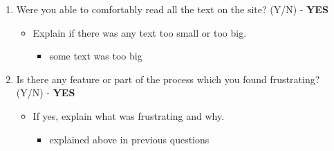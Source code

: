 \documentclass[12pt]{article}
\begin{document}
\begin{enumerate}
    \item Were you able to comfortably read all the text on the site? (Y/N) - \textbf{YES}
      \begin{itemize}
        \item Explain if there was any text too small or too big.
        \begin{itemize}
          \item some text was too big
        \end{itemize}
      \end{itemize}
    \item  Is there any feature or part of the process which you found frustrating? (Y/N) - \textbf{YES}
      \begin{itemize}
        \item If yes, explain what was frustrating and why.
        \begin{itemize}
          \item explained above in previous questions
        \end{itemize}
      \end{itemize}
  \end{enumerate}
\end{document}
